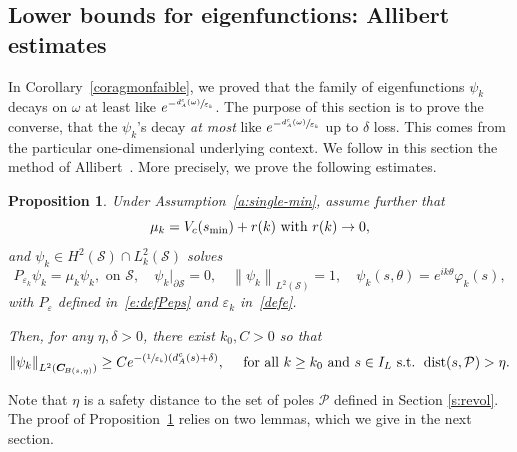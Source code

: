 \documentclass[10pt]{amsart}
\newcommand{\Psfrac}[2]{(\sfrac{#1}{#2})}
\newtheorem{proposition}[lemma]{Proposition}
\theoremstyle{definition}
\renewcommand{\P}{\ensuremath{\mathcal P}}
\newcommand{\calS}{\ensuremath{\mathcal S}}
\DeclareMathOperator{\dist}{dist}
\newcommand\nor[2]{\left\|#1\right\|_{#2}}
\newcommand{\ce}{c}
\let\d\partial
\let\e\varepsilon
\let\eps\varepsilon
\newcommand\CO[1]{\boldsymbol{C}_{\!#1}}
\begin{document}
\subsection{Lower bounds for eigenfunctions: Allibert estimates}
\label{sectlower}
In Corollary~\ref{coragmonfaible}, we proved that the family of eigenfunctions $\psi_k$ decays on $\omega$ at least like $e^{-\sfrac{d_A^{\ce}(\omega)}{\eps_k}}$.
The purpose of this section is to prove the converse, \ie that the $\psi_k$'s decay {\em at most} like $e^{-\sfrac{d_A^{\ce}(\omega)}{\eps_k}}$ up to $\delta$ loss.
This comes from the particular one-dimensional underlying context.
We follow in this section the method of Allibert~\cite{Allibert:98}.
More precisely, we prove the following estimates.
\begin{proposition}
\label{propinfdA}
Under Assumption~\ref{a:single-min}, assume further that
\begin{equation}
\label{rappelmuinf}\mu_k = V_\ce(s_{\min}) +r(k)\textnormal{ with }r(k)\to 0,
\end{equation}
and $\psi_k \in H^2 (\mathcal{S})\cap L^2_k(\calS)$ solves
\[
P_{\e_k}\psi_k=\mu_k \psi_k, \text{ on } \calS, \quad \psi_k|_{\d\calS} = 0,\quad \nor{\psi_k}{L^2(\calS)}=1, \quad \psi_k(s, \theta) = e^{ik \theta}\varphi_k(s),
\]
with $P_\eps$ defined in~\eqref{e:defPeps} and $\e_k$ in~\eqref{defe}.

Then, for any $\eta,\delta>0$, there exist $k_0,C>0$ so that
\[
\nor{\psi_k}{L^2(\CO{B(s,\eta)})}\geq C e^{-\Psfrac{1}{\e_k}(d_A^{\ce}(s)+\delta)}, \quad \text{ for all } k\geq k_0\text{ and }s \in I_L \text{ s.t. }\dist(s,\mathcal{P} )>\eta.
\]
\end{proposition}
Note that $\eta$ is a safety distance to the set of poles $\P$ defined in Section \ref{s:revol}.
The proof of Proposition~\ref{propinfdA} relies on two lemmas, which we give in the next section.
\end{document}
